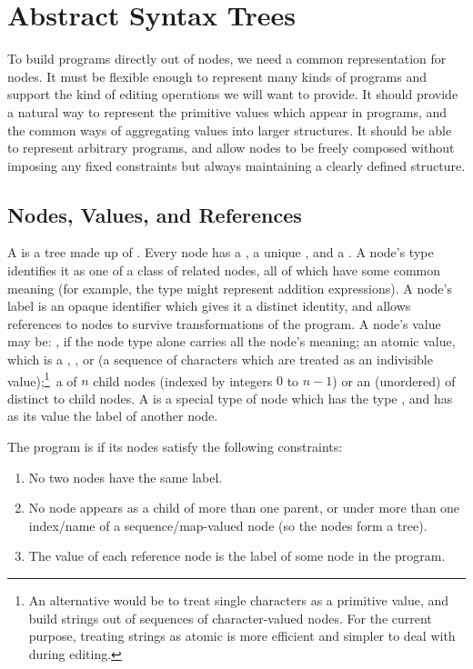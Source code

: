 \chapter{Abstract Syntax Trees}
\label{ASTs}
To build programs directly out of nodes, we need a common representation for nodes. It must be flexible enough to represent many kinds of programs and support the kind of editing operations we will want to provide. It should provide a natural way to represent the primitive values which appear in programs, and the common ways of aggregating values into larger structures. It should be able to represent arbitrary programs, and allow nodes to be freely composed without imposing any fixed constraints but always maintaining a clearly defined structure.


\section{Nodes, Values, and References}
A  is a tree made up of . Every node has a , a unique , and a . A node's type identifies it as one of a class of related nodes, all of which have some common meaning (for example, the type  might represent addition expressions). A node's label is an opaque identifier which gives it a distinct identity, and allows references to nodes to survive transformations of the program. A node's value may be: , if the node type alone carries all the node's meaning; an atomic value, which is a , , or  (a sequence of characters which are treated as an indivisible value);\footnote{An alternative would be to treat single characters as a primitive value, and build strings out of sequences of character-valued nodes. For the current purpose, treating strings as atomic is more efficient and simpler to deal with during editing.}\ a  of $n$ child nodes (indexed by integers $0$ to $n-1$) or an (unordered)  of distinct  to child nodes. A  is a special type of node which has the type , and has as its value the label of another node.

The program is  if its nodes satisfy the following constraints:
\begin{enumerate}
\item No two nodes have the same label.
\item No node appears as a child of more than one parent, or under more than one index/name of a sequence/map-valued node (so the nodes form a tree).
\item The value of each reference node is the label of some node in the program.
\end{enumerate}

